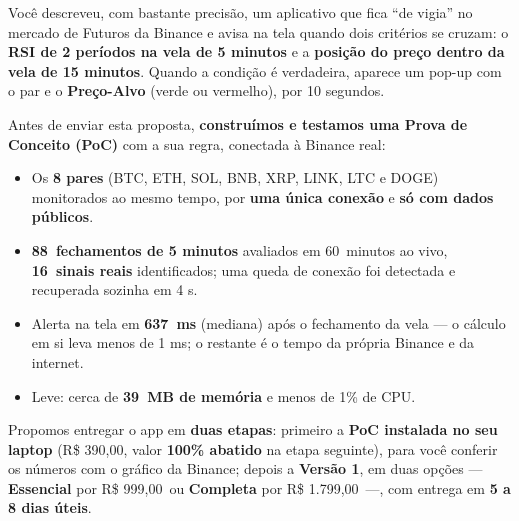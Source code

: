 \documentclass[11pt,a4paper]{article}
\newcommand{\icoCheck} {\textcolor{sinalW}{\ding{51}}}
\newcommand{\pocMin}{60}
\newcommand{\pocAval}{88}
\newcommand{\pocSinais}{16}
\newcommand{\pocLatMed}{637}
\newcommand{\pocRam}{39}
\newcommand{\valPoc}{390,00}
\newcommand{\valA}{999,00}
\newcommand{\valB}{1.799,00}
\begin{document}
\newpage
\hypersetup{pageanchor=true}
\setcounter{page}{1}

\vspace*{2mm}
\begin{tcolorbox}[execbox, title={Sumário Executivo}]
  Você descreveu, com bastante precisão, um aplicativo que fica ``de vigia'' no mercado de
  Futuros da Binance e avisa na tela quando dois critérios se cruzam: o \textbf{RSI de 2
  períodos na vela de 5 minutos} e a \textbf{posição do preço dentro da vela de 15 minutos}.
  Quando a condição é verdadeira, aparece um pop-up com o par e o \textbf{Preço-Alvo}
  (verde ou vermelho), por 10 segundos.

  \vspace{3pt}
  Antes de enviar esta proposta, \textbf{construímos e testamos uma Prova de Conceito (PoC)}
  com a sua regra, conectada à Binance real:

  \begin{itemize}[leftmargin=1.6em, itemsep=3pt, topsep=2pt]
    \item[\icoCheck] Os \textbf{8 pares} (BTC, ETH, SOL, BNB, XRP, LINK, LTC e DOGE) monitorados ao
      mesmo tempo, por \textbf{uma única conexão} e \textbf{só com dados públicos}.
    \item[\icoCheck] \textbf{\pocAval\ fechamentos de 5 minutos} avaliados em \pocMin\ minutos ao vivo,
      \textbf{\pocSinais\ sinais reais} identificados; uma queda de conexão foi detectada e recuperada sozinha em 4 s.
    \item[\icoCheck] Alerta na tela em \textbf{\pocLatMed\ ms} (mediana) após o fechamento da vela
      --- o cálculo em si leva menos de 1 ms; o restante é o tempo da própria Binance e da internet.
    \item[\icoCheck] Leve: cerca de \textbf{\pocRam\ MB de memória} e menos de 1\% de CPU.
  \end{itemize}

  \vspace{3pt}
  Propomos entregar o app em \textbf{duas etapas}: primeiro a \textbf{PoC instalada no seu
  laptop} (R\$ \valPoc, valor \textbf{100\% abatido} na etapa seguinte), para você conferir os
  números com o gráfico da Binance; depois a \textbf{Versão 1}, em duas opções ---
  \textbf{Essencial} por R\$ \valA\ ou \textbf{Completa} por R\$ \valB\ ---, com entrega em
  \textbf{5 a 8 dias úteis}.
\end{tcolorbox}
\end{document}
